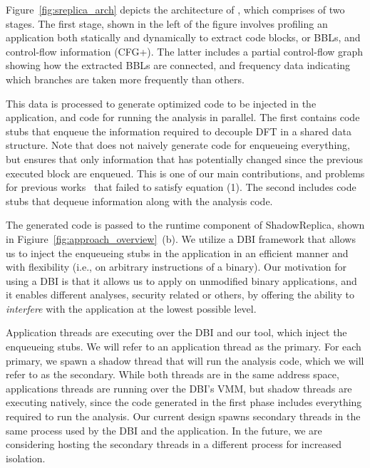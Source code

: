 Figure~\ref{fig:sreplica_arch} depicts the architecture of \sreplica, which
comprises of two stages. The first stage, shown in the left of the figure
involves profiling an application both statically and dynamically to extract
code blocks, or BBLs, and control-flow information (CFG+). The latter includes
a partial control-flow graph showing how the extracted BBLs are connected, and
frequency data indicating which branches are taken more frequently than others.

This data is processed to generate optimized code to be injected in the
application, and code for running the analysis in parallel. The first contains
code stubs that enqueue the information required to decouple DFT in a shared
data structure. Note that \sreplica does not naively generate code for
enqueueing everything, but ensures that only information that has potentially
changed since the previous executed block are enqueued. This is one of our main
contributions, and problems for previous works~\cite{speck:asplos2008,
superpin:cgo2007, pipa:cgo2008} that failed to satisfy equation (1). The second
includes code stubs that dequeue information along with the analysis code.

The generated code is passed to the runtime component of ShadowReplica, shown
in Figiure~\ref{fig:approach_overview}~(b). We utilize a DBI framework that
allows us to inject the enqueueing stubs in the application in an efficient
manner and with flexibility (i.e., on arbitrary instructions of a binary). Our
motivation for using a DBI is that it allows us to apply \sreplica on
unmodified binary applications, and it enables different analyses, security
related or others, by offering the ability to {\it interfere} with the application
at the lowest possible level.

Application threads are executing over the DBI and our tool, which inject the
enqueueing stubs. We will refer to an application thread as the primary. For
each primary, we spawn a shadow thread that will run the analysis code, which
we will refer to as the secondary. While both threads are in the same address
space, applications threads are running over the DBI’s VMM, but shadow threads
are executing natively, since the code generated in the first phase includes
everything required to run the analysis. Our current design spawns secondary
threads in the same process used by the DBI and the application. In the future,
we are considering hosting the secondary threads in a different process for
increased isolation.


